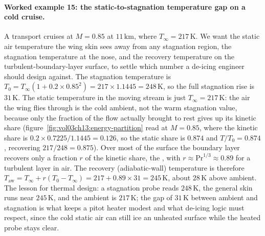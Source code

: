\paragraph{Worked example 15: the static-to-stagnation temperature gap
on a cold cruise.} A transport cruises at $M = 0.85$ at
$11\,\si{\kilo\meter}$, where $T_\infty = 217\,\si{\kelvin}$. We want
the static air temperature the wing skin sees away from any stagnation
region, the stagnation temperature at the nose, and the recovery
temperature on the turbulent-boundary-layer surface, to settle which
number a de-icing engineer should design against. The stagnation
temperature is $T_0 = T_\infty(1 + 0.2\times 0.85^2) =
217\times 1.1445 = 248\,\si{\kelvin}$, so the full stagnation rise is
$31\,\si{\kelvin}$. The static temperature in the moving stream is just
$T_\infty = 217\,\si{\kelvin}$: the air the wing flies through is the
cold ambient, not the warm stagnation value, because only the
fraction of the flow actually brought to rest gives up its kinetic
share (figure~\ref{fig:vol03ch13:energy-partition} read at $M = 0.85$,
where the kinetic share is $0.2\times 0.7225/1.1445 = 0.126$, so the
static share is $0.874$ and $T/T_0 = 0.874$, recovering
$217/248 = 0.875$). Over most of the surface the boundary layer
recovers only a fraction $r$ of the kinetic share, the
, with $r \approx \mathrm{Pr}^{1/3}\approx
0.89$ for a turbulent layer in air. The recovery (adiabatic-wall)
temperature is therefore $T_{\text{aw}} = T_\infty + r(T_0 - T_\infty)
= 217 + 0.89\times 31 = 245\,\si{\kelvin}$, about $28\,\si{\kelvin}$
above ambient. The lesson for thermal design: a stagnation probe reads
$248\,\si{\kelvin}$, the general skin runs near $245\,\si{\kelvin}$,
and the ambient is $217\,\si{\kelvin}$; the gap of $31\,\si{\kelvin}$
between ambient and stagnation is what keeps a pitot heater modest and
what de-icing logic must respect, since the cold static air can still
ice an unheated surface while the heated probe stays clear.

